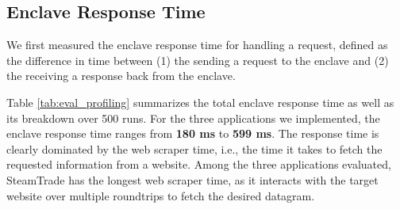 \vspace{-2mm}
\subsection{Enclave Response Time}
\label{subsec:response time}
We first measured the enclave response time for handling a \tc request, defined as the difference in time between (1)  
the \medname sending a request to the enclave 
and (2) the \medname receiving a response back from the enclave. 

Table \ref{tab:eval_profiling} summarizes the total enclave response time as
well as its breakdown over 500 runs.  For the three applications we
implemented, the enclave response time ranges from {\bf 180 ms} to {\bf 599 ms}.
The response time is clearly dominated by the web scraper time, i.e., the time
it takes to fetch the requested information from a website.  Among the three
applications evaluated, {\sf SteamTrade} has the longest web scraper time, as it interacts with the target website
over multiple roundtrips to fetch the desired datagram.


